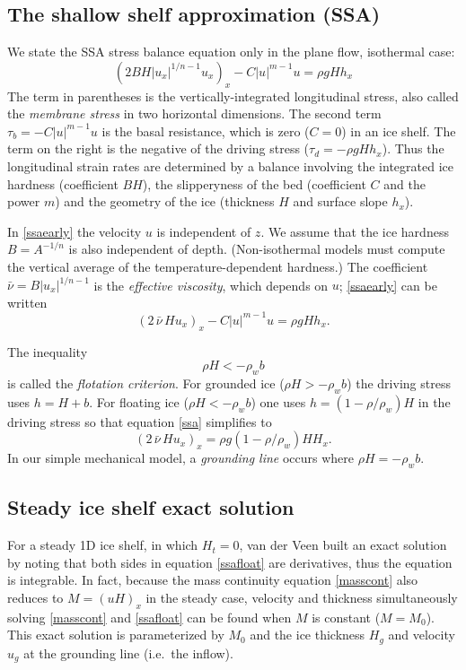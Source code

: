 \documentclass[letterpaper,final,12pt,reqno]{amsart}
\begin{document}
\subsection*{The shallow shelf approximation (SSA)}  We state the SSA stress balance equation only in the plane flow, isothermal case:
\begin{equation}
  \left(2 B H |u_x|^{1/n - 1} u_x\right)_x - C|u|^{m-1}u = \rho g H h_x \label{ssaearly}
\end{equation}
The term in parentheses is the vertically-integrated longitudinal stress, also called the \emph{membrane stress} in two horizontal dimensions.  The second term $\tau_b = - C|u|^{m-1}u$ is the basal resistance, which is zero ($C=0$) in an ice shelf.  The term on the right is the negative of the driving stress ($\tau_d = - \rho g H h_x$).  Thus the longitudinal strain rates are determined by a balance involving the integrated ice hardness (coefficient $BH$), the slipperyness of the bed (coefficient $C$ and the power $m$) and the geometry of the ice (thickness $H$ and surface slope $h_x$).

In \eqref{ssaearly} the velocity $u$ is independent of $z$.  We assume that the ice hardness $B=A^{-1/n}$ is also independent of depth.  (Non-isothermal models must compute the vertical average of the temperature-dependent hardness.)  The coefficient $\bar \nu = B |u_x|^{1/n-1}$ is the \emph{effective viscosity}, which depends on $u$; \eqref{ssaearly} can be written
\begin{equation}
  \left(2 \,\bar \nu\, H u_x\right)_x - C |u|^{m-1} u = \rho g H h_x.  \label{ssa}
\end{equation}

The inequality
\begin{equation}
\rho H < - \rho_w b     \label{flotation}
\end{equation}
is called the \emph{flotation criterion}.  For grounded ice ($\rho H > - \rho_w b$) the driving stress uses $h = H+b$.  For floating ice ($\rho H < - \rho_w b$) one uses $h = (1-\rho/\rho_w) H$ in the driving stress so that equation \eqref{ssa} simplifies to
\begin{equation}
   \left(2 \,\bar\nu\, H u_x\right)_x = \rho g (1-\rho/\rho_w) H H_x. \label{ssafloat}
\end{equation}
In our simple mechanical model, a \emph{grounding line} occurs where $\rho H = - \rho_w b$.

\subsection*{Steady ice shelf exact solution}  For a steady 1D ice shelf, in which $H_t=0$, van der Veen \cite{vanderVeen83} built an exact solution by noting that both sides in equation \eqref{ssafloat} are derivatives, thus the equation is integrable.  In fact, because the mass continuity equation \eqref{masscont} also reduces to $M=(uH)_x$ in the steady case, velocity and thickness simultaneously solving \eqref{masscont} and \eqref{ssafloat} can be found when $M$ is constant ($M=M_0$).  This exact solution is parameterized by $M_0$ and the ice thickness $H_g$ and velocity $u_g$ at the grounding line (i.e.~the inflow).
\end{document}
